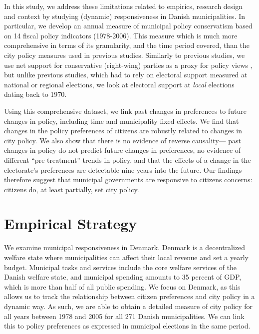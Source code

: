 \documentclass[a4paper,12pt]{article}
\begin{document}
In this study, we address these limitations related to empirics, research design and context by studying (dynamic) responsiveness in Danish municipalities. In particular, we develop an annual measure of municipal policy conservatism based on 14 fiscal policy indicators (1978-2006). This measure which is much more comprehensive in terms of its granularity, and the time period covered, than the city policy measures used in previous studies. Similarly to previous studies, we use net support for conservative (right-wing) parties as a proxy for policy views \citep[e.g.,][]{einstein2016pushing}, but unlike previous studies, which had to rely on electoral support measured at national or regional elections, we look at electoral support at \textit{local} elections dating back to 1970. 

Using this comprehensive dataset, we link past changes in preferences to future changes in policy, including time and municipality fixed effects. We find that changes in the policy preferences of citizens are robustly related to changes in city policy. We also show that there is no evidence of reverse causality--- past changes in policy do not predict future changes in preferences, no evidence of different ``pre-treatment'' trends in policy, and that the effects of a change in the electorate's preferences are detectable nine years into the future. Our findings therefore suggest that municipal governments are responsive to citizens concerns: citizens do, at least partially, set city policy.


\section*{Empirical Strategy}

 We examine municipal responsiveness in Denmark. Denmark is a decentralized welfare state where municipalities can affect their local revenue and set a yearly budget.  Municipal tasks and services include the core welfare services of the Danish welfare state, and municipal spending amounts to 35 percent of GDP, which is more than half of all public spending. We focus on Denmark, as this allows us to track the relationship between citizen preferences and city policy in a dynamic way. As such, we are able to obtain a detailed measure of city policy for all years between 1978 and 2005 for all 271 Danish municipalities.  We can link this to policy preferences as expressed in municipal elections in the same period.
 
 
\end{document}
